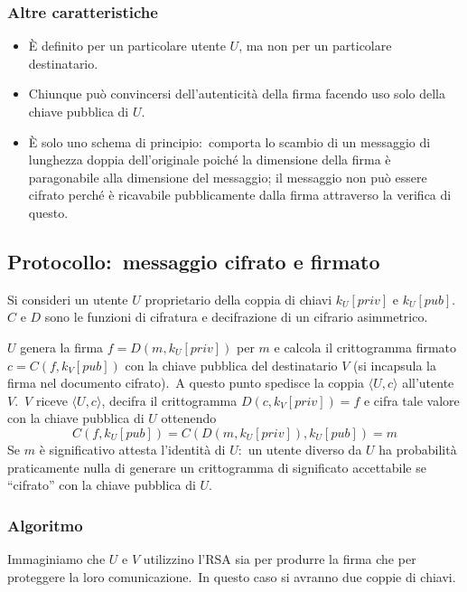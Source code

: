 \subsubsection{Altre caratteristiche}

\begin{itemize}
    \item È definito per un particolare utente $U$, ma non per un particolare destinatario.\
    \item Chiunque può convincersi dell'autenticità della firma facendo uso solo della chiave pubblica di $U$.\
    \item È solo uno schema di principio:\ comporta lo scambio di un messaggio di lunghezza doppia dell'originale poiché la dimensione della firma è paragonabile alla dimensione del messaggio; il messaggio non può essere cifrato perché è ricavabile pubblicamente dalla firma attraverso la verifica di questo.\
\end{itemize}


\subsection{Protocollo:\ messaggio cifrato e firmato}

Si consideri un utente $U$ proprietario della coppia di chiavi $k_U[\mathit{priv}]$ e $k_U[\mathit{pub}]$.\
$C$ e $D$ sono le funzioni di cifratura e decifrazione di un cifrario asimmetrico.\

$U$ genera la firma $f = D(m, k_U[\mathit{priv}])$ per $m$ e calcola il crittogramma firmato $c = C(f, k_V[\mathit{pub}])$ con la chiave pubblica del destinatario $V$ (si incapsula la firma nel documento cifrato).\
A questo punto spedisce la coppia $\langle U,c \rangle$ all'utente $V$.\
$V$ riceve $\langle U,c \rangle$, decifra il crittogramma $D(c, k_V[\mathit{priv}]) = f$ e cifra tale valore con la chiave pubblica di $U$ ottenendo
\[C(f, k_U[\mathit{pub}]) = C (D(m, k_U[\mathit{priv}]), k_U[\mathit{pub}]) = m \]
Se $m$ è significativo attesta l'identità di $U$:\ un utente diverso da $U$ ha probabilità praticamente nulla di generare un crittogramma di significato accettabile se ``cifrato'' con la chiave pubblica di $U$.\

\subsubsection{Algoritmo}

Immaginiamo che $U$ e $V$ utilizzino l'RSA sia per produrre la firma che per proteggere la loro comunicazione.\
In questo caso si avranno due coppie di chiavi.

